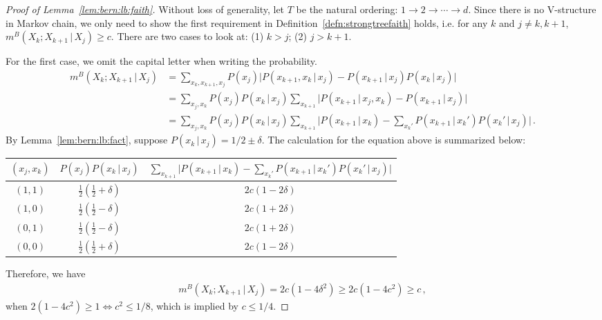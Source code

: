 \documentclass{article}
\theoremstyle{definition}
\theoremstyle{definition}
\theoremstyle{definition}
\theoremstyle{definition}
\theoremstyle{definition}
\theoremstyle{definition}
\theoremstyle{remark}
\theoremstyle{remark}
\newcommand{\given}{\,|\,}
\newcommand{\dpdm}{m}
\newcommand{\dd}{d}
\begin{document}
\begin{proof}[Proof of Lemma~\ref{lem:bern:lb:faith}]
Without loss of generality, let $T$ be the natural ordering: $1\to 2\to \cdots \to \dd$. Since there is no V-structure in Markov chain, we only need to show the first requirement in Definition~\ref{defn:strongtreefaith} holds, i.e. for any $k$ and $j\ne k,k+1$, $\dpdm^B(X_k;X_{k+1}\given X_j)\ge c$.
There are two cases to look at: (1) $k > j$; (2) $j > k+1$.

For the first case, we omit the capital letter when writing the probability.
\begin{align*}
    \dpdm^B(X_k;X_{k+1}\given X_j) & = \sum_{x_{k},x_{k+1},x_j} P(x_j) \Big|P(x_{k+1},x_k\given x_j) - P(x_{k+1}\given x_j) P(x_k \given x_j) \Big| \\
    & = \sum_{x_j, x_k} P(x_j)P(x_k\given x_j) \sum_{x_{k+1}}\Big|P(x_{k+1}\given x_j,x_k) - P(x_{k+1}\given x_j) \Big| \\
    & = \sum_{x_j, x_k} P(x_j)P(x_k\given x_j) \sum_{x_{k+1}}\Big|P(x_{k+1}\given x_k) - \sum_{x_k'}P(x_{k+1}\given x_k')P(x_k'\given x_j) \Big| \,.
\end{align*}
By Lemma~\ref{lem:bern:lb:fact}, suppose $P(x_k\given x_j)=1/2\pm\delta$. The calculation for the equation above is summarized below:

\begin{table}[h]
\centering
\begin{tabular}{@{}ccc@{}}
\toprule
$(x_j,x_k)$ & $P(x_j)P(x_k\given x_j)$          & $\sum_{x_{k+1}}\Big|P(x_{k+1}\given x_k) - \sum_{x_k'}P(x_{k+1}\given x_k')P(x_k'\given x_j) \Big|$ \\ \midrule
$(1,1)$     & $\frac{1}{2}(\frac{1}{2}+\delta)$ & $2c(1-2\delta)$                                                                    \\
$(1,0)$     & $\frac{1}{2}(\frac{1}{2}-\delta)$ & $2c(1+2\delta)$                                                                    \\
$(0,1)$     & $\frac{1}{2}(\frac{1}{2}-\delta)$ & $2c(1+2\delta)$                                                                    \\
$(0,0)$     & $\frac{1}{2}(\frac{1}{2}+\delta)$ & $2c(1-2\delta)$                                                                    \\ \bottomrule
\end{tabular}
\end{table}

\noindent 
Therefore, we have 
\begin{align*}
    \dpdm^B(X_k;X_{k+1}\given X_j) = 2c(1-4\delta^2) \ge 2c(1-4c^2) \ge c  \,,
\end{align*}
when $2(1-4c^2) \ge 1 \iff c^2\le 1/8$, which is implied by $c\le 1/4$.


\end{proof}
\end{document}
